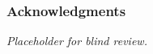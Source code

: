 \documentclass{article}
\begin{document}






\subsubsection*{Acknowledgments}

{\em Placeholder for blind review.}






\end{document}
